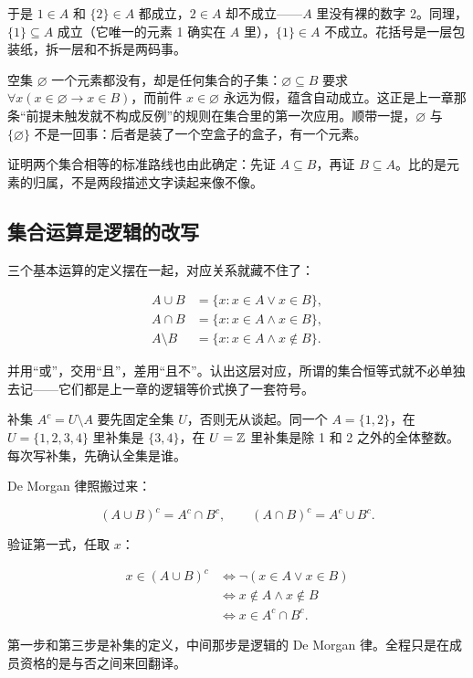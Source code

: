 于是 \(1\in A\) 和 \(\{2\}\in A\) 都成立，\(2\in A\) 却不成立——\(A\) 里没有裸的数字 2。同理，\(\{1\}\subseteq A\) 成立（它唯一的元素 1 确实在 \(A\) 里），\(\{1\}\in A\) 不成立。花括号是一层包装纸，拆一层和不拆是两码事。

空集 \(\varnothing\) 一个元素都没有，却是任何集合的子集：\(\varnothing\subseteq B\) 要求 \(\forall x(x\in\varnothing\to x\in B)\)，而前件 \(x\in\varnothing\) 永远为假，蕴含自动成立。这正是上一章那条``前提未触发就不构成反例''的规则在集合里的第一次应用。顺带一提，\(\varnothing\) 与 \(\{\varnothing\}\) 不是一回事：后者是装了一个空盒子的盒子，有一个元素。

证明两个集合相等的标准路线也由此确定：先证 \(A\subseteq B\)，再证 \(B\subseteq A\)。比的是元素的归属，不是两段描述文字读起来像不像。

\subsection{集合运算是逻辑的改写}

三个基本运算的定义摆在一起，对应关系就藏不住了：

\[
\begin{aligned}
A\cup B&=\{x:x\in A\lor x\in B\},\\
A\cap B&=\{x:x\in A\land x\in B\},\\
A\setminus B&=\{x:x\in A\land x\notin B\}.
\end{aligned}
\]

并用``或''，交用``且''，差用``且不''。认出这层对应，所谓的集合恒等式就不必单独去记——它们都是上一章的逻辑等价式换了一套符号。

补集 \(A^{c}=U\setminus A\) 要先固定全集 \(U\)，否则无从谈起。同一个 \(A=\{1,2\}\)，在 \(U=\{1,2,3,4\}\) 里补集是 \(\{3,4\}\)，在 \(U=\mathbb{Z}\) 里补集是除 1 和 2 之外的全体整数。每次写补集，先确认全集是谁。

De Morgan 律照搬过来：

\[
(A\cup B)^{c}=A^{c}\cap B^{c},
\qquad
(A\cap B)^{c}=A^{c}\cup B^{c}.
\]

验证第一式，任取 \(x\)：

\[
\begin{aligned}
x\in(A\cup B)^{c}
&\Longleftrightarrow \neg(x\in A\lor x\in B)\\
&\Longleftrightarrow x\notin A\land x\notin B\\
&\Longleftrightarrow x\in A^{c}\cap B^{c}.
\end{aligned}
\]

第一步和第三步是补集的定义，中间那步是逻辑的 De Morgan 律。全程只是在成员资格的是与否之间来回翻译。

